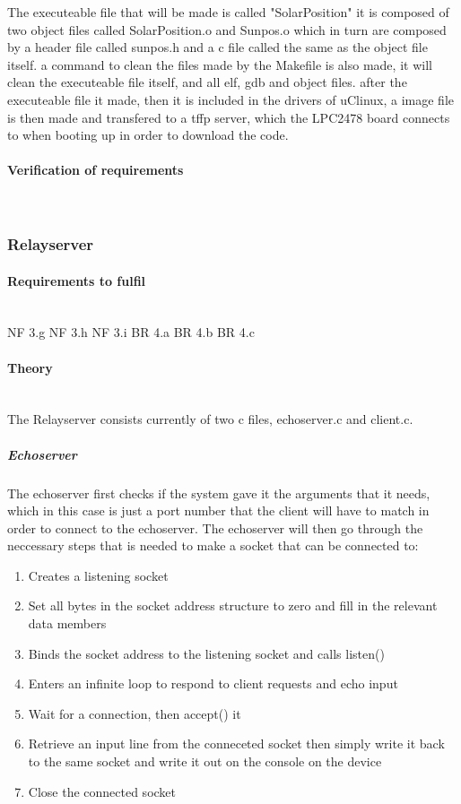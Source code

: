 The executeable file that will be made is called "SolarPosition" it is composed of two object files called SolarPosition.o and Sunpos.o which in turn are composed by a header file called sunpos.h and a c file called the same as the object file itself.
a command to clean the files made by the Makefile is also made, it will clean the executeable file itself, and all elf, gdb and object files. 
after the executeable file it made, then it is included in the drivers of uClinux, a image file is then made and transfered to a tffp server, which the LPC2478 board connects to when booting up in order to download the code.

\paragraph{Verification of requirements}\mbox{}\\

\subsubsection{Relayserver}
\paragraph{Requirements to fulfil}\mbox{}\\
NF 3.g
NF 3.h
NF 3.i
BR 4.a
BR 4.b
BR 4.c

\paragraph{Theory}\mbox{}\\
The Relayserver consists currently of two c files, echoserver.c and client.c.
\subparagraph{Echoserver}
The echoserver first checks if the system gave it the arguments that it needs, which in this case is just a port number that the client will have to match in order to connect to the echoserver. 
The echoserver will then go through the neccessary steps that is needed to make a socket that can be connected to:
\begin{enumerate}
\item Creates a listening socket
\item Set all bytes in the socket address structure to zero and fill in the relevant data members
\item Binds the socket address to the listening socket and calls listen()
\item Enters an infinite loop to respond to client requests and echo input
\item Wait for a connection, then accept() it
\item Retrieve an input line from the conneceted socket then simply write it back to the same socket and write it out on the console on the device
\item Close the connected socket
\end{enumerate}

